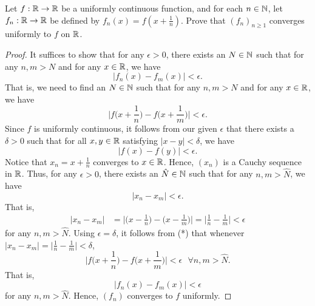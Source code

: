 \documentclass[a4paper]{article}
\begin{document}
\begin{problem}
    Let \( f: \mathbb{R} \to \mathbb{R}  \) be a uniformly continuous function, and for each \( n \in \mathbb{N} \), let \( {f}_{n}: \mathbb{R} \to \mathbb{R}  \) be defined by \( {f}_{n}(x) = f(x + \frac{ 1 }{ n } ) \). Prove that \( ({f}_{n})_{n \geq 1} \) converges uniformly to \( f  \) on \( \mathbb{R}  \).
\end{problem}
\begin{proof}
    It suffices to show that for any \( \epsilon > 0  \), there exists an \( N \in \mathbb{N} \) such that for any \( n,m > N  \) and for any \( x \in \mathbb{R}  \), we have 
    \[  | {f}_{n}(x) - {f}_{m}(x) | < \epsilon. \tag{*} \]
    That is, we need to find an \( N \in \mathbb{N} \) such that for any \( n,m > N  \) and for any \( x \in \mathbb{R}  \), we have 
    \[  \Big| f \Big(  x + \frac{ 1 }{ n }  \Big)  - f \Big(  x + \frac{ 1 }{ m }  \Big) \Big| < \epsilon. \]
    Since \( f  \) is uniformly continuous, it follows from our given \( \epsilon  \) that there exists a \( \delta > 0  \) such that for all \( x,y \in \mathbb{R}  \) satisfying \( | x - y  |  < \delta \), we have 
    \[  | f(x) - f(y)  | < \epsilon. \]
    Notice that \( {x}_{n} = x + \frac{ 1 }{ n }  \) converges to \( x  \in \mathbb{R}  \). Hence, \( ({x}_{n}) \) is a Cauchy sequence in \( \mathbb{R}  \). Thus, for any \( \epsilon > 0  \), there exists an \( \hat{N} \in \mathbb{N} \) such that for any \( n,m > \hat{N}  \), we have 
    \[ | {x}_{n} - {x}_{m} | < \epsilon. \]
    That is, 
    \begin{align*}
        | {x}_{n} - {x}_{m} | &= \Big| \Big(  x - \frac{ 1 }{ n }  \Big) - \Big(  x - \frac{ 1 }{ m }  \Big) \Big|  
                              = \Big| \frac{ 1 }{ n }  - \frac{ 1 }{ m }  \Big|  < \epsilon
    \end{align*}
    for any \( n,m > \hat{N} \). Using \( \epsilon = \delta \), it follows from (*) that whenever \( | {x}_{n} - {x}_{m} | = \big| \frac{ 1 }{ n }  - \frac{ 1 }{ m }  \big| < \delta\), 
    \[ \Big| f \Big(  x + \frac{ 1 }{ n }   \Big) - f \Big(  x + \frac{ 1 }{ m }  \Big) \Big|  < \epsilon \ \ \ \forall n,m > \hat{N}.  \]
    That is, 
    \[  | {f}_{n}(x) - {f}_{m}(x) | < \epsilon \]
   for any \( n,m > \hat{N} \). Hence, \( ({f}_{n}) \) converges to \( f  \) uniformly.
\end{proof}
\end{document}
